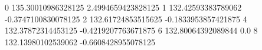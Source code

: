 0 135.30010986328125 2.4994659423828125
1 132.42593383789062 -0.3747100830078125
2 132.61724853515625 -0.1833953857421875
4 132.37872314453125 -0.4219207763671875
6 132.80064392089844 0.0
8 132.13980102539062 -0.6608428955078125
